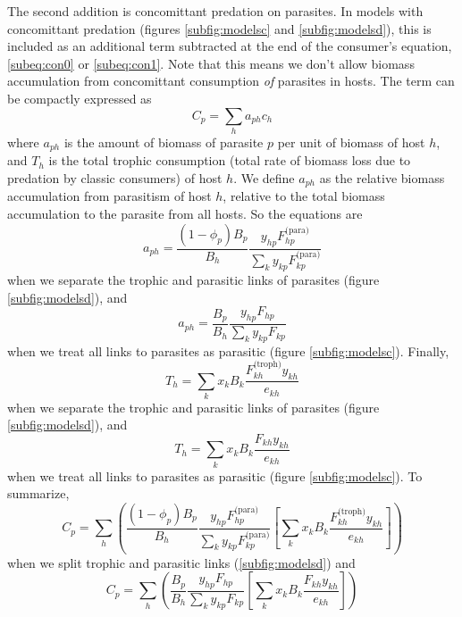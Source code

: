 \documentclass[11pt]{amsart}
\begin{document}
The second addition is concomittant predation on parasites.  In models with concomittant predation (figures \ref{subfig:modelsc} and \ref{subfig:modelsd}), this is included as an additional term subtracted at the end of the consumer's equation, \eqref{subeq:con0} or \eqref{subeq:con1}.  Note that this means we don't allow biomass accumulation from concomittant consumption \textit{of} parasites in hosts.  The term can be compactly expressed as 
\begin{equation}
C_p = \sum_ha_{ph}c_h \label{cp1}
\end{equation}
where $a_{ph}$ is the amount of biomass of parasite $p$ per unit of biomass of host $h$, and $T_h$ is the total trophic consumption (total rate of biomass loss due to predation by classic consumers) of host $h$.  We define $a_{ph}$ as the relative biomass accumulation from parasitism of host $h$, relative to the total biomass accumulation to the parasite from all hosts.  So the equations are 
\begin{equation}
a_{ph} = \frac{(1-\phi_p)B_p}{B_h}\frac{y_{hp}F^\text{(para)}_{hp}}{\sum_{k}y_{kp}F^\text{(para)}_{kp}} \label{aph1}
\end{equation}
when we separate the trophic and parasitic links of parasites (figure \ref{subfig:modelsd}), and
\begin{equation}
a_{ph} = \frac{B_p}{B_h}\frac{y_{hp}F_{hp}}{\sum_{k}y_{kp}F_{kp}} \label{aph0}
\end{equation}
when we treat all links to parasites as parasitic (figure \ref{subfig:modelsc}).  Finally,
\begin{equation}
T_h = \sum_kx_kB_k\frac{F^\text{(troph)}_{kh}y_{kh}}{e_{kh}} \label{eq:Th1}
\end{equation}
when we separate the trophic and parasitic links of parasites (figure \ref{subfig:modelsd}), and
\begin{equation}
T_h = \sum_kx_kB_k\frac{F_{kh}y_{kh}}{e_{kh}} \label{eq:Th1}
\end{equation}
when we treat all links to parasites as parasitic (figure \ref{subfig:modelsc}).  To summarize,
\begin{equation}
C_p = \sum_h \left(\frac{(1-\phi_p)B_p}{B_h}\frac{y_{hp}F^\text{(para)}_{hp}}{\sum_{k}y_{kp}F^\text{(para)}_{kp}}\left[\sum_kx_kB_k\frac{F^\text{(troph)}_{kh}y_{kh}}{e_{kh}}\right] \right) \label{cp2}
\end{equation}
when we split trophic and parasitic links (\ref{subfig:modelsd}) and
\begin{equation}
C_p = \sum_h \left(\frac{B_p}{B_h}\frac{y_{hp}F_{hp}}{\sum_{k}y_{kp}F_{kp}}\left[\sum_kx_kB_k\frac{F_{kh}y_{kh}}{e_{kh}}\right] \right) \label{cp2}
\end{equation}
\end{document}
